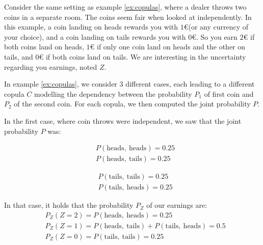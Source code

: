 \begin{example}
    Consider the same setting as example \ref{ex:copulas}, where a dealer throws two coins in a separate room. The coins seem fair when looked at independently. In this example, a coin landing on heads rewards you with $1$€(or any currency of your choice), and a coin landing on tails rewards you with $0$€. So you earn $2$€ if both coins land on heads, $1$€ if only one coin land on heads and the other on tails, and $0$€ if both coins land on tails. We are interesting in the uncertainty regarding you earnings, noted $Z$.
    
    In example \ref{ex:copulas}, we consider $3$ different cases, each leading to a different copula $C$ modelling the dependency between the probability $P_1$ of first coin and $P_2$ of the second coin. For each copula, we then computed the joint probability $P$.
    
    In the first case, where coin throws were independent, we saw that the joint probability $P$ was:\\
    \begin{minipage}[b]{0.5\linewidth}
    \begin{align*}
        & P(\text{heads}, ~\text{heads}) = 0.25\\
        & P(\text{heads}, ~\text{tails}) = 0.25
    \end{align*}
    \end{minipage}
    \begin{minipage}[b]{0.5\linewidth}
    \begin{align*}
        & P(\text{tails}, ~\text{tails}) = 0.25 \\
        & P(\text{tails}, ~\text{heads}) = 0.25
    \end{align*}
    \end{minipage}
    In that case, it holds that the probability $P_Z$ of our earnings are:
    \begin{align*}
        & P_Z(Z=2) = P(\text{heads}, ~\text{heads}) = 0.25\\
        & P_Z(Z=1) = P(\text{heads}, ~\text{tails}) + P(\text{tails}, ~\text{heads}) = 0.5 \\
        & P_Z(Z=0) = P(\text{tails}, ~\text{tails}) = 0.25
    \end{align*}
    

\end{example}
